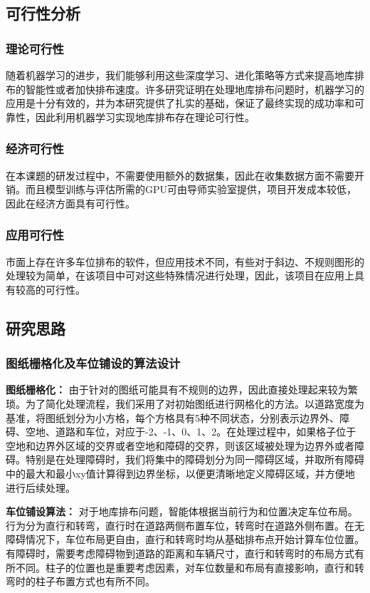 \subsection{可行性分析}
\subsubsection{理论可行性}
随着机器学习的进步，我们能够利用这些深度学习、进化策略\cite{1020332216.nh}等方式来提高地库排布的智能性或者加快排布速度。许多研究证明在处理地库排布问题时，机器学习的应用是十分有效的，并为本研究提供了扎实的基础，保证了最终实现的成功率和可靠性，因此利用机器学习实现地库排布存在理论可行性。
\subsubsection{经济可行性}
在本课题的研发过程中，不需要使用额外的数据集，因此在收集数据方面不需要开销。而且模型训练与评估所需的GPU可由导师实验室提供，项目开发成本较低，因此在经济方面具有可行性。
\subsubsection{应用可行性}
市面上存在许多车位排布的软件，但应用技术不同，有些对于斜边、不规则图形的处理较为简单，在该项目中可对这些特殊情况进行处理，因此，该项目在应用上具有较高的可行性。
\subsection{研究思路}
\subsubsection{图纸栅格化及车位铺设的算法设计}
{\bfseries 图纸栅格化：}
由于针对的图纸可能具有不规则的边界，因此直接处理起来较为繁琐。为了简化处理流程，我们采用了对初始图纸进行网格化的方法。以道路宽度为基准，将图纸划分为小方格，每个方格具有5种不同状态，分别表示边界外、障碍、空地、道路和车位，对应于-2、-1、0、1、2。在处理过程中，如果格子位于空地和边界外区域的交界或者空地和障碍的交界，则该区域被处理为边界外或者障碍。特别是在处理障碍时，我们将集中的障碍划分为同一障碍区域，并取所有障碍中的最大和最小xy值计算得到边界坐标，以便更清晰地定义障碍区域，并方便地进行后续处理。

{\bfseries 车位铺设算法：}
对于地库排布问题，智能体根据当前行为和位置决定车位布局。行为分为直行和转弯，直行时在道路两侧布置车位，转弯时在道路外侧布置。在无障碍情况下，车位布局更自由，直行和转弯时均从基础排布点开始计算车位位置。有障碍时，需要考虑障碍物到道路的距离和车辆尺寸，直行和转弯时的布局方式有所不同。柱子的位置也是重要考虑因素，对车位数量和布局有直接影响，直行和转弯时的柱子布置方式也有所不同。

